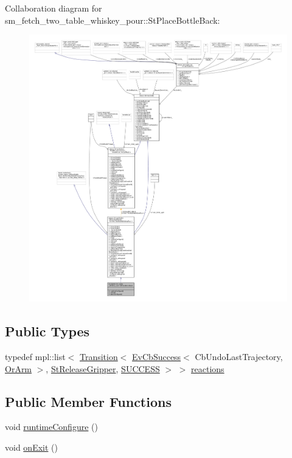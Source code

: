 Collaboration diagram for sm\+\_\+fetch\+\_\+two\+\_\+table\+\_\+whiskey\+\_\+pour\+:\+:St\+Place\+Bottle\+Back\+:
\nopagebreak
\begin{figure}[H]
\begin{center}
\leavevmode
\includegraphics[width=350pt]{structsm__fetch__two__table__whiskey__pour_1_1StPlaceBottleBack__coll__graph}
\end{center}
\end{figure}
\subsection*{Public Types}
\begin{DoxyCompactItemize}
\item 
typedef mpl\+::list$<$ \hyperlink{classsmacc_1_1Transition}{Transition}$<$ \hyperlink{structsmacc_1_1EvCbSuccess}{Ev\+Cb\+Success}$<$ Cb\+Undo\+Last\+Trajectory, \hyperlink{classsm__fetch__two__table__whiskey__pour_1_1OrArm}{Or\+Arm} $>$, \hyperlink{structsm__fetch__two__table__whiskey__pour_1_1StReleaseGripper}{St\+Release\+Gripper}, \hyperlink{structsmacc_1_1default__transition__tags_1_1SUCCESS}{S\+U\+C\+C\+E\+SS} $>$ $>$ \hyperlink{structsm__fetch__two__table__whiskey__pour_1_1StPlaceBottleBack_ac9775454d1927c31daf52739c002a103}{reactions}
\end{DoxyCompactItemize}
\subsection*{Public Member Functions}
\begin{DoxyCompactItemize}
\item 
void \hyperlink{structsm__fetch__two__table__whiskey__pour_1_1StPlaceBottleBack_a6891bc106ffb3fa0f8c89f892e1ca8bb}{runtime\+Configure} ()
\item 
void \hyperlink{structsm__fetch__two__table__whiskey__pour_1_1StPlaceBottleBack_a751154d4e90ef2f20b2142145c71cb23}{on\+Exit} ()
\end{DoxyCompactItemize}
